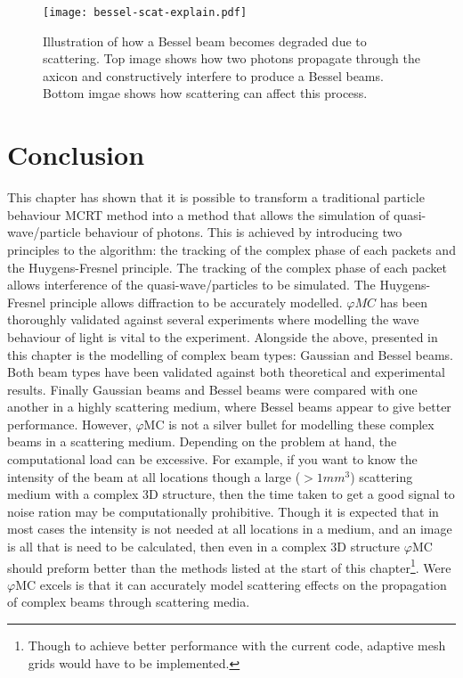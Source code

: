 \begin{figure}[!htbp]
    \centering
    \texttt{[image: bessel-scat-explain.pdf]}
    \caption{Illustration of how a Bessel beam becomes degraded due to scattering. Top image shows how two photons propagate through the axicon and constructively interfere to produce a Bessel beams. Bottom imgae shows how scattering can affect this process.}
    \label{fig:bessel-scat-explain}
\end{figure}



\section{Conclusion}

This chapter has shown that it is possible to transform a traditional particle behaviour MCRT method into a method that allows the simulation of quasi-wave/particle behaviour of photons.
This is achieved by introducing two principles to the algorithm: the tracking of the complex phase of each packets and the Huygens-Fresnel principle.
The tracking of the complex phase of each packet allows interference of the quasi-wave/particles to be simulated.
The Huygens-Fresnel principle allows diffraction to be accurately modelled.
$\varphi MC$ has been thoroughly validated against several experiments where modelling the wave behaviour of light is vital to the experiment.
Alongside the above, presented in this chapter is the modelling of complex beam types: Gaussian and Bessel beams.
Both beam types have been validated against both theoretical and experimental results.
Finally Gaussian beams and Bessel beams were compared with one another in a highly scattering medium, where Bessel beams appear to give better performance.
However, $\varphi$MC is not a silver bullet for modelling these complex beams in a scattering medium.
Depending on the problem at hand, the computational load can be excessive.
For example, if you want to know the intensity of the beam at all locations though a large ($> 1mm^3$) scattering medium with a complex 3D structure, then the time taken to get a good signal to noise ration may be computationally prohibitive.
Though it is expected that in most cases the intensity is not needed at all locations in a medium, and an image is all that is need to be calculated, then even in a complex 3D structure $\varphi$MC should preform better than the methods listed at the start of this chapter\footnote{Though to achieve better performance with the current code, adaptive mesh grids would have to be implemented.}.
Were $\varphi$MC excels is that it can accurately model scattering effects on the propagation of complex beams through scattering media.

